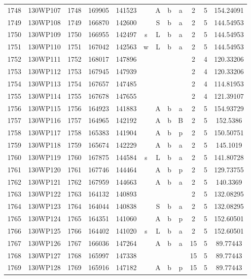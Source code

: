 \begin{tabular}{|*{12}{c|}}
1748 & 130WP107 & 1748 & 169905 & 141523 &  & A & b & a & 2 & 5 & 154.24091 \\ 
1749 & 130WP108 & 1749 & 166870 & 142600 &  & S & b & a & 2 & 5 & 144.54953 \\ 
1750 & 130WP109 & 1750 & 166955 & 142497 & s & L & b & a & 2 & 5 & 144.54953 \\ 
1751 & 130WP110 & 1751 & 167042 & 142563 & w & L & b & a & 2 & 5 & 144.54953 \\ 
1752 & 130WP111 & 1752 & 168017 & 147896 &  &  &  &  & 2 & 4 & 120.33206 \\ 
1753 & 130WP112 & 1753 & 167945 & 147939 &  &  &  &  & 2 & 4 & 120.33206 \\ 
1754 & 130WP113 & 1754 & 167657 & 147485 &  &  &  &  & 2 & 4 & 114.81953 \\ 
1755 & 130WP114 & 1755 & 167678 & 147655 &  &  &  &  & 2 & 4 & 121.39107 \\ 
1756 & 130WP115 & 1756 & 164923 & 141883 &  & A & b & a & 2 & 5 & 154.93729 \\ 
1757 & 130WP116 & 1757 & 164965 & 142192 &  & A & b & B & 2 & 5 & 152.5386 \\ 
1758 & 130WP117 & 1758 & 165383 & 141904 &  & A & b & p & 2 & 5 & 150.50751 \\ 
1759 & 130WP118 & 1759 & 165674 & 142229 &  & A & b & a & 2 & 5 & 145.1019 \\ 
1760 & 130WP119 & 1760 & 167875 & 144584 & s & L & b & a & 2 & 5 & 141.80728 \\ 
1761 & 130WP120 & 1761 & 167746 & 144464 &  & A & b & p & 2 & 5 & 129.73755 \\ 
1762 & 130WP121 & 1762 & 167959 & 144663 &  & A & b & a & 2 & 5 & 140.3369 \\ 
1763 & 130WP122 & 1763 & 164132 & 140893 &  &  &  &  & 2 & 5 & 132.08295 \\ 
1764 & 130WP123 & 1764 & 164044 & 140838 &  & S & b & a & 2 & 5 & 132.08295 \\ 
1765 & 130WP124 & 1765 & 164351 & 141060 &  & A & b & p & 2 & 5 & 152.60501 \\ 
1766 & 130WP125 & 1766 & 164402 & 141020 & s & L & b & a & 2 & 5 & 152.60501 \\ 
1767 & 130WP126 & 1767 & 166036 & 147264 &  & A & b & a & 15 & 5 & 89.77443 \\ 
1768 & 130WP127 & 1768 & 165997 & 147338 &  &  &  &  & 15 & 5 & 89.77443 \\ 
1769 & 130WP128 & 1769 & 165916 & 147182 &  & A & b & p & 15 & 5 & 89.77443 \\ 

\end{tabular}
